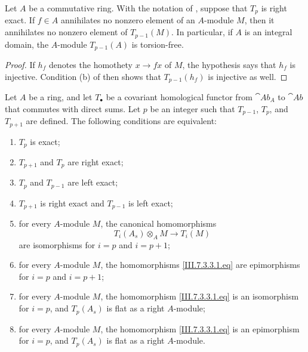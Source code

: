 \begin{corollary}[7.3.2]
\label{III.7.3.2}
Let $A$ be a commutative ring.  With the notation of
, suppose that $T_p$ is right exact.  If
$f\in A$ annihilates no nonzero element of an $A$-module $M$,
then it annihilates no nonzero element of $T_{p-1}(M)$.  In
particular, if $A$ is an integral domain, the $A$-module
$T_{p-1}(A)$ is torsion-free.
\end{corollary}

\begin{proof}
If $h_f$ denotes the homothety $x\to fx$ of $M$, the
hypothesis says that $h_f$ is injective.  Condition (b) of
 then shows that $T_{p-1}(h_f)$ is injective
as well.
\end{proof}

\begin{proposition}[7.3.3]
\label{III.7.3.3}
Let $A$ be a ring, and let $T_\bullet$ be a covariant
homological functor from $\cat{Ab}_A$ to $\cat{Ab}$ that
commutes with direct sums.  Let $p$ be an integer such that
$T_{p-1}$, $T_p$, and $T_{p+1}$ are defined.  The following
conditions are equivalent:
\begin{enumerate}
  \item[(a)] $T_p$ is exact;
  \item[(b)] $T_{p+1}$ and $T_p$ are right exact;
  \item[(c)] $T_p$ and $T_{p-1}$ are left exact;
  \item[(d)] $T_{p+1}$ is right exact and $T_{p-1}$ is left
    exact;
  \item[(e)] for every $A$-module $M$, the canonical
    homomorphisms
    \[
      T_i(A_s)\otimes_A M
      \longrightarrow
      T_i(M)
      \tag{7.3.3.1}\label{III.7.3.3.1.eq}
    \]
    are isomorphisms for $i=p$ and $i=p+1$;
  \item[($\mathrm{e}'$)] for every $A$-module $M$, the
    homomorphisms \eqref{III.7.3.3.1.eq} are epimorphisms for
    $i=p$ and $i=p+1$;
  \item[(f)] for every $A$-module $M$, the homomorphism
    \eqref{III.7.3.3.1.eq} is an isomorphism for $i=p$, and
    $T_p(A_s)$ is flat as a right $A$-module;
  \item[($\mathrm{f}'$)] for every $A$-module $M$, the
    homomorphism \eqref{III.7.3.3.1.eq} is an epimorphism for
    $i=p$, and $T_p(A_s)$ is flat as a right $A$-module.
\end{enumerate}
\end{proposition}

